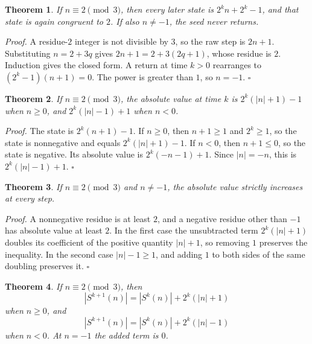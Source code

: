 \documentclass[11pt,letterpaper]{article}
\newtheorem{theorem}{Theorem}
\newenvironment{proof}{\noindent\textit{Proof.}}{\hfill\(\square\)}
\begin{document}
\begin{theorem}
\label{thm:residue2}
If \(n\equiv 2\pmod{3}\), then every later state is \(2^{k}n+2^{k}-1\), and that state is again congruent to \(2\). If also \(n\ne -1\), the seed never returns.
\end{theorem}

\begin{proof}
A residue-\(2\) integer is not divisible by \(3\), so the raw step is \(2n+1\). Substituting \(n=2+3q\) gives \(2n+1=2+3(2q+1)\), whose residue is \(2\). Induction gives the closed form. A return at time \(k>0\) rearranges to \((2^{k}-1)(n+1)=0\). The power is greater than \(1\), so \(n=-1\).
\end{proof}

\begin{theorem}
\label{thm:residueabs}
If \(n\equiv 2\pmod{3}\), the absolute value at time \(k\) is \(2^{k}(|n|+1)-1\) when \(n\ge 0\), and \(2^{k}(|n|-1)+1\) when \(n<0\).
\end{theorem}

\begin{proof}
The state is \(2^{k}(n+1)-1\). If \(n\ge 0\), then \(n+1\ge 1\) and \(2^{k}\ge 1\), so the state is nonnegative and equals \(2^{k}(|n|+1)-1\). If \(n<0\), then \(n+1\le 0\), so the state is negative. Its absolute value is \(2^{k}(-n-1)+1\). Since \(|n|=-n\), this is \(2^{k}(|n|-1)+1\).
\end{proof}

\begin{theorem}
\label{thm:residueinc}
If \(n\equiv 2\pmod{3}\) and \(n\ne -1\), the absolute value strictly increases at every step.
\end{theorem}

\begin{proof}
A nonnegative residue is at least \(2\), and a negative residue other than \(-1\) has absolute value at least \(2\). In the first case the unsubtracted term \(2^{k}(|n|+1)\) doubles its coefficient of the positive quantity \(|n|+1\), so removing \(1\) preserves the inequality. In the second case \(|n|-1\ge 1\), and adding \(1\) to both sides of the same doubling preserves it.
\end{proof}

\begin{theorem}
\label{thm:residuediff}
If \(n\equiv 2\pmod{3}\), then
\[
|S^{k+1}(n)|=|S^{k}(n)|+2^{k}(|n|+1)
\]
when \(n\ge 0\), and
\[
|S^{k+1}(n)|=|S^{k}(n)|+2^{k}(|n|-1)
\]
when \(n<0\). At \(n=-1\) the added term is \(0\).
\end{theorem}
\end{document}
